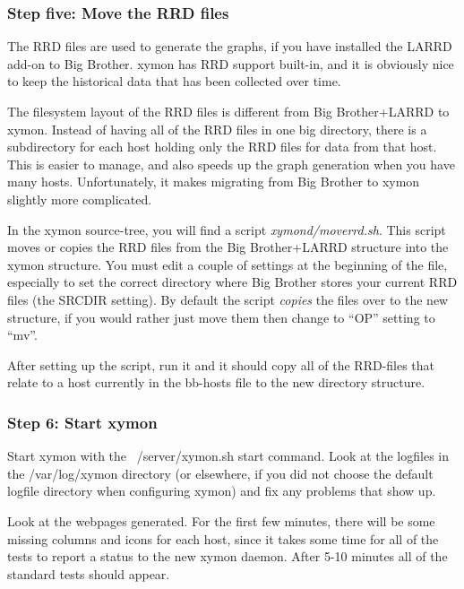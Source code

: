 \subsubsection{Step five: Move the RRD files}


 The RRD files are used to generate the graphs, if you have installed
 the LARRD add-on to Big Brother. xymon has RRD support built-in, and
 it is obviously nice to keep the historical data that has been
 collected over time.



 The filesystem layout of the RRD files is different from Big
 Brother+LARRD to xymon. Instead of having all of the RRD files in
 one big directory, there is a subdirectory for each host holding only
 the RRD files for data from that host. This is easier to manage, and
 also speeds up the graph generation when you have many
 hosts. Unfortunately, it makes migrating from Big Brother to xymon
 slightly more complicated.



 In the xymon source-tree, you will find a script
 \emph{xymond/moverrd.sh}. This script moves or copies the RRD files
 from the Big Brother+LARRD structure into the xymon structure. You
 must edit a couple of settings at the beginning of the file,
 especially to set the correct directory where Big Brother stores your
 current RRD files (the SRCDIR setting). By default the script
 \emph{copies} the files over to the new structure, if you would
 rather just move them then change to ``OP'' setting to ``mv''.


 After setting up the script, run it and it should copy all of the
 RRD-files that relate to a host currently in the bb-hosts file to the
 new directory structure.

\subsubsection{Step 6: Start xymon}


 Start xymon with the ~/server/xymon.sh start command. Look at the
 logfiles in the /var/log/xymon directory (or elsewhere, if you did
 not choose the default logfile directory when configuring xymon) and
 fix any problems that show up.



 Look at the webpages generated. For the first few minutes, there will
 be some missing columns and icons for each host, since it takes some
 time for all of the tests to report a status to the new xymon
 daemon. After 5-10 minutes all of the standard tests should appear.


